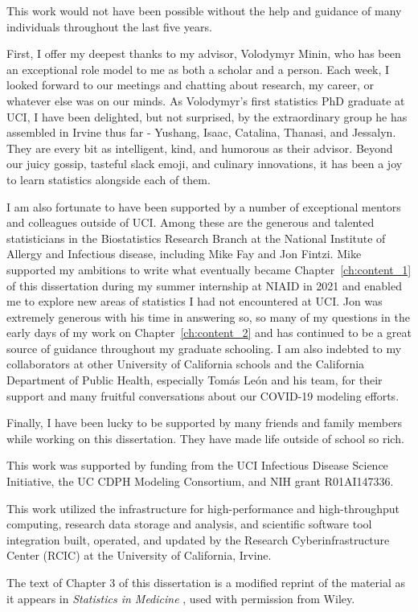 \acknowledgments
{



This work would not have been possible without the help and guidance of many individuals throughout the last five years.

First, I offer my deepest thanks to my advisor, Volodymyr Minin, who has been an exceptional role model to me as both a scholar and a person.
Each week, I looked forward to our meetings and chatting about research, my career, or whatever else was on our minds.
As Volodymyr's first statistics PhD graduate at UCI, I have been delighted, but not surprised, by the extraordinary group he has assembled in Irvine thus far - Yushang, Isaac, Catalina, Thanasi, and Jessalyn.
They are every bit as intelligent, kind, and humorous as their advisor.
Beyond our juicy gossip, tasteful slack emoji, and culinary innovations, it has been a joy to learn statistics alongside each of them.

I am also fortunate to have been supported by a number of exceptional mentors and colleagues outside of UCI.
Among these are the generous and talented statisticians in the Biostatistics Research Branch at the National Institute of Allergy and Infectious disease, including Mike Fay and Jon Fintzi.
Mike supported my ambitions to write what eventually became Chapter~\ref{ch:content_1} of this dissertation during my summer internship at NIAID in 2021 and enabled me to explore new areas of statistics I had not encountered at UCI.
Jon was extremely generous with his time in answering so, so many of my questions in the early days of my work on Chapter~\ref{ch:content_2} and has continued to be a great source of guidance throughout my graduate schooling.
I am also indebted to my collaborators at other University of California schools and the California Department of Public Health, especially Tom\'{a}s Le\'{o}n and his team, for their support and many fruitful conversations about our COVID-19 modeling efforts.

Finally, I have been lucky to be supported by many friends and family members while working on this dissertation.
They have made life outside of school so rich.

This work was supported by funding from the UCI Infectious Disease Science Initiative, the UC CDPH Modeling Consortium, and NIH grant R01AI147336.

This work utilized the infrastructure for high-performance and high-throughput computing, research data storage and analysis, and scientific software tool integration built, operated, and updated by the Research Cyberinfrastructure Center (RCIC) at the University of California, Irvine.

The text of Chapter 3 of this dissertation is a modified reprint of the material as it appears in \textit{Statistics in Medicine} \citep{Bayer2023Confidence}, used with permission from Wiley.
}


